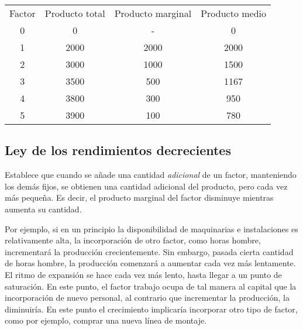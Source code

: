 \vspace{.5cm}
\begin{table}[H]
    \centering
    \begin{tabular}{cccc}
        \hline
        Factor & Producto total & Producto marginal & Producto medio \\
        0      & 0              & -                 & 0              \\
        1      & 2000           & 2000              & 2000           \\
        2      & 3000           & 1000              & 1500           \\
        3      & 3500           & 500               & 1167           \\
        4      & 3800           & 300               & 950            \\
        5      & 3900           & 100               & 780            \\
        \hline
    \end{tabular}
\end{table}
\vspace{.5cm}

\subsection{Ley de los rendimientos decrecientes}

Establece que cuando se añade una cantidad \textit{adicional} de un factor,
manteniendo los demás fijos,
se obtienen una cantidad adicional del producto,
pero cada vez más pequeña.
Es decir, 
el producto marginal del factor disminuye mientras aumenta su cantidad.

Por ejemplo,
si en un principio la disponibilidad de maquinarias e instalaciones 
es relativamente alta,
la incorporación de otro factor,
como horas hombre,
incrementará la producción crecientemente.
Sin embargo,
pasada cierta cantidad de horas hombre,
la producción comenzará a aumentar cada vez más lentamente.
El ritmo de expansión se hace cada vez más lento,
hasta llegar a un punto de saturación.
En este punto,
el factor trabajo ocupa de tal manera al capital que la incorporación de nuevo 
personal, 
al contrario que incrementar la producción,
la diminuiría.
En este punto el crecimiento implicaría incorporar otro tipo de factor,
como por ejemplo, comprar una nueva línea de montaje.

